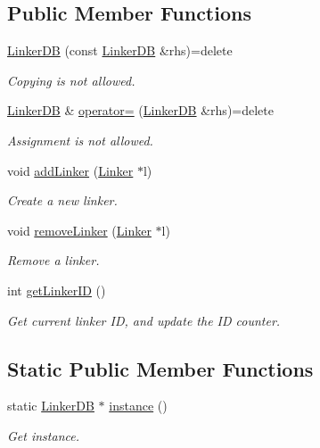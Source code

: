 \subsection*{Public Member Functions}
\begin{DoxyCompactItemize}
\item 
\hyperlink{classLinkerDB_af910b4ad55b19bf38e66558438068229}{Linker\+D\+B} (const \hyperlink{classLinkerDB}{Linker\+D\+B} \&rhs)=delete
\begin{DoxyCompactList}\small\item\em Copying is not allowed. \end{DoxyCompactList}\item 
\hyperlink{classLinkerDB}{Linker\+D\+B} \& \hyperlink{classLinkerDB_ab4d311688ca436179ceed0297aacd1b0}{operator=} (\hyperlink{classLinkerDB}{Linker\+D\+B} \&rhs)=delete
\begin{DoxyCompactList}\small\item\em Assignment is not allowed. \end{DoxyCompactList}\item 
void \hyperlink{classLinkerDB_aa71e5126fbf4debe99e9d92782c3db28}{add\+Linker} (\hyperlink{classLinker}{Linker} $\ast$l)
\begin{DoxyCompactList}\small\item\em Create a new linker. \end{DoxyCompactList}\item 
void \hyperlink{classLinkerDB_a80e61cbde7836116fa1b099fd833a002}{remove\+Linker} (\hyperlink{classLinker}{Linker} $\ast$l)
\begin{DoxyCompactList}\small\item\em Remove a linker. \end{DoxyCompactList}\item 
int \hyperlink{classLinkerDB_aba81b4efaa9764aad20713183fa61505}{get\+Linker\+I\+D} ()
\begin{DoxyCompactList}\small\item\em Get current linker I\+D, and update the I\+D counter. \end{DoxyCompactList}\end{DoxyCompactItemize}
\subsection*{Static Public Member Functions}
\begin{DoxyCompactItemize}
\item 
static \hyperlink{classLinkerDB}{Linker\+D\+B} $\ast$ \hyperlink{classLinkerDB_af9522f683e73a346c8336f47ac59b93b}{instance} ()
\begin{DoxyCompactList}\small\item\em Get instance. \end{DoxyCompactList}\end{DoxyCompactItemize}
